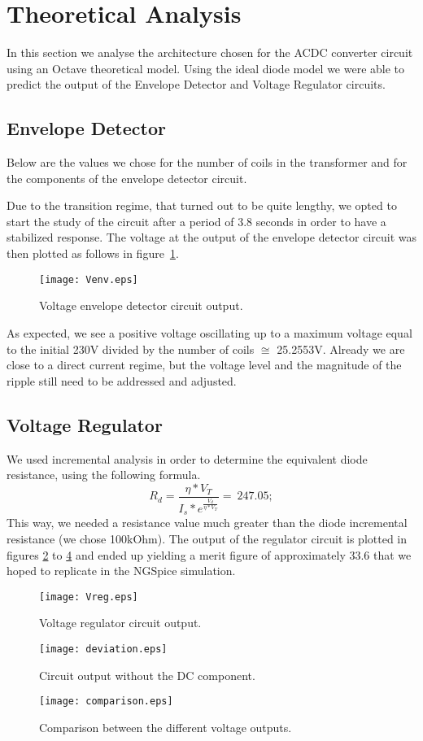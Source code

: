 \section{Theoretical Analysis}
\label{sec:analysis}

In this section we analyse the architecture chosen for the ACDC converter circuit using an Octave theoretical model. Using the ideal diode model we were able to predict the output of the Envelope Detector and Voltage Regulator circuits.

\subsection{Envelope Detector}
Below are the values we chose for the number of coils in the transformer and for the components of the envelope detector circuit.

Due to the transition regime, that turned out to be quite lengthy, we opted to start the study of the circuit after a period of 3.8 seconds in order to have a stabilized response.
The voltage at the output of the envelope detector circuit was then plotted as follows in figure~\ref{fig:enveloped}.
\begin{figure}[h!] \centering
\texttt{[image: Venv.eps]}
\caption{Voltage envelope detector circuit output.}
\label{fig:enveloped}
\end{figure} \par
As expected, we see a positive voltage oscillating up to a maximum voltage equal to the initial 230V divided by the number of coils $\cong$ 25.2553V. Already we are close to a direct current regime, but the voltage level and the magnitude of the ripple still need to be addressed and adjusted.
\subsection{Voltage Regulator}
We used incremental analysis in order to determine the equivalent diode resistance, using the following formula.
\begin{equation}
R_d=\frac{\eta*V_T}{I_s*e^\frac{V_d}{\eta*V_T}}=~247.05;
\end{equation}
This way, we needed a resistance value much greater than the diode incremental resistance (we chose 100kOhm). The output of the regulator circuit is plotted in figures \ref{fig:reg} to \ref{fig:output} and ended up yielding a merit figure of approximately 33.6 that we hoped to replicate in the NGSpice simulation.
\begin{figure}[h!] \centering
\texttt{[image: Vreg.eps]}
\caption{Voltage regulator circuit output.}
\label{fig:reg}
\end{figure}
\begin{figure}[h!] \centering
\texttt{[image: deviation.eps]}
\caption{Circuit output without the DC component.}
\label{fig:dc}
\end{figure}
\begin{figure}[h!] \centering
\texttt{[image: comparison.eps]}
\caption{Comparison between the different voltage outputs.}
\label{fig:output}
\end{figure}
\par
